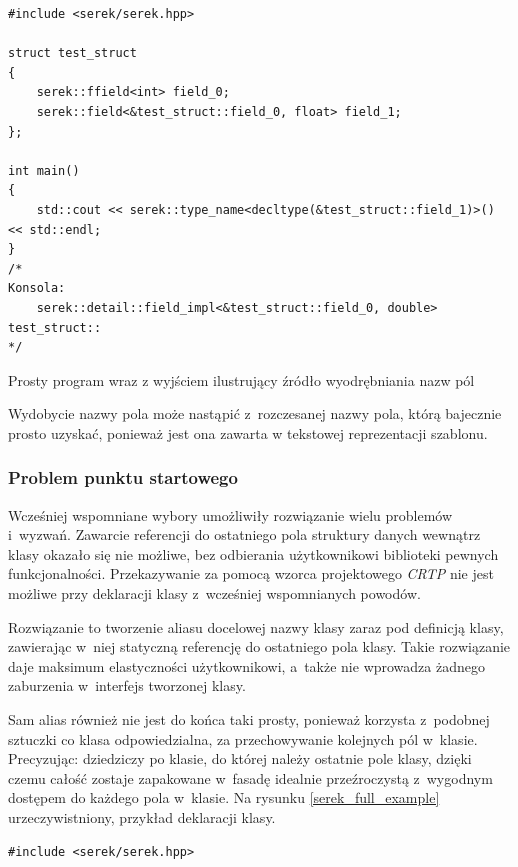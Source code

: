 \documentclass[12pt]{article}
\newcommand{\n}{\newline}
\newcommand{\nonpl}[1]{{\it #1}}
\newcommand{\CRTP}{\nonpl{CRTP} }
\begin{document}
{{{				\begin{captioned}[H]
				\begin{lstlisting}[frame=single]
#include <serek/serek.hpp>

struct test_struct
{
	serek::ffield<int> field_0;
	serek::field<&test_struct::field_0, float> field_1;
};

int main()
{
	std::cout << serek::type_name<decltype(&test_struct::field_1)>() << std::endl;
}
/*
Konsola:
	serek::detail::field_impl<&test_struct::field_0, double> test_struct::
*/
				\end{lstlisting}
				\caption{ Prosty program wraz z wyjściem ilustrujący źródło wyodrębniania nazw pól}
				\label{typename_example}
			\end{captioned}

				Wydobycie nazwy pola może nastąpić z~rozczesanej nazwy pola, którą bajecznie prosto uzyskać, ponieważ jest ona zawarta
				w tekstowej reprezentacji szablonu.
			}

			{
				\subsubsection{Problem punktu startowego}

				Wcześniej wspomniane wybory umożliwiły rozwiązanie wielu problemów i~wyzwań. Zawarcie referencji do ostatniego pola
				struktury danych wewnątrz klasy okazało się nie możliwe, bez odbierania użytkownikowi biblioteki pewnych funkcjonalności.
				Przekazywanie za pomocą wzorca projektowego \CRTP nie jest możliwe przy deklaracji klasy z~wcześniej wspomnianych powodów.\n

				Rozwiązanie to tworzenie aliasu docelowej nazwy klasy zaraz pod definicją klasy, zawierając w~niej statyczną referencję do ostatniego pola klasy.
				Takie rozwiązanie daje maksimum elastyczności użytkownikowi, a~także nie wprowadza żadnego zaburzenia w~interfejs tworzonej klasy.\n

				Sam alias również nie jest do końca taki prosty, ponieważ korzysta z~podobnej sztuczki co klasa odpowiedzialna, za przechowywanie
				kolejnych pól w~klasie. Precyzując: dziedziczy po klasie, do której należy ostatnie pole klasy, dzięki czemu całość zostaje
				zapakowane w~fasadę idealnie przeźroczystą z~wygodnym dostępem do każdego pola w~klasie. Na rysunku \ref{serek_full_example} urzeczywistniony,
				przykład deklaracji klasy.\n

				\begin{captioned}[H]
					\begin{lstlisting}[frame=single]
#include <serek/serek.hpp>


\end{lstlisting}
\end{captioned}}}}
\end{document}
